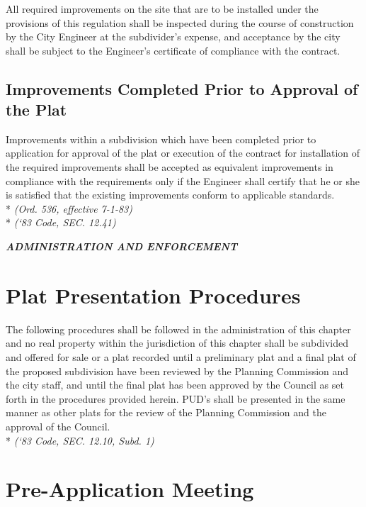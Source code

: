 \subsubsection{}
All required improvements on the site that are to be installed under the provisions of this regulation shall be inspected during the course of construction by the City Engineer at the subdivider’s expense, and acceptance by the city shall be subject to the Engineer’s certificate of compliance with the contract.
\subsection{Improvements Completed Prior to Approval of the Plat}
Improvements within a subdivision which have been completed prior to application for approval of the plat or execution of the contract for installation of the required improvements shall be accepted as equivalent improvements in compliance with the requirements only if the Engineer shall certify that he or she is satisfied that the existing improvements conform to applicable standards.\\*
\emph{(Ord. 536, effective 7-1-83)}\\*
\emph{(‘83 Code, SEC. 12.41)}

\begin{center}
    \emph{\textbf{\LARGE{ADMINISTRATION AND ENFORCEMENT}}}
\end{center}

\setcounter{section}{64}
\section{Plat Presentation Procedures}
The following procedures shall be followed in the administration of this chapter and no real property within the jurisdiction of this chapter shall be subdivided and offered for sale or a plat recorded until a preliminary plat and a final plat of the proposed subdivision have been reviewed by the Planning Commission and the city staff, and until the final plat has been approved by the Council as set forth in the procedures provided herein. PUD’s shall be presented in the same manner as other plats for the review of the Planning Commission and the approval of the Council.\\*
\emph{(‘83 Code, SEC. 12.10, Subd. 1)}
\section{Pre-Application Meeting}

